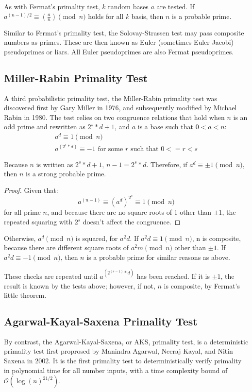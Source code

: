 \documentclass{article}
\begin{document}
As with Fermat's primality test, $k$ random bases $a$ are tested. If $a^{(n - 1) / 2} \equiv (\frac{a}{n}) \pmod{n}$ holds for all $k$ basis, then $n$ is a probable prime.

Similar to Fermat's primality test, the Solovay-Strassen test may pass composite numbers as primes. These are then known as Euler (sometimes Euler-Jacobi) pseudoprimes or liars. All Euler pseudoprimes are also Fermat pseudoprimes. 

\subsection{Miller-Rabin Primality Test} %
A third probabilistic primality test, the Miller-Rabin primality test was discovered first by Gary Miller in 1976, and subsequently modified by Michael Rabin in 1980. The test relies on two congruence relations that hold when $n$ is an odd prime and rewritten as $2^s * d + 1$, and $a$ is a base such that $0 < a < n$:
\begin{gather*}
    a^d \equiv 1 \pmod{n} \\
    a^{(2^r * d)} \equiv -1 \text{ for some $r$ such that $0 <= r < s$}
\end{gather*}

Because $n$ is written as $2^s * d + 1$, $n - 1 = 2^s * d$. Therefore, if $a^d \equiv \pm 1 \pmod{n}$, then $n$ is a strong probable prime.

\begin{proof}
    Given that:
    \[
        a^{(n - 1)} \equiv (a^d)^{2^s} \equiv 1 \pmod{n}
    \]
    for all prime $n$, and because there are no square roots of 1 other than $\pm 1$, the repeated squaring with $2^s$ doesn't affect the congruence.
\end{proof}

Otherwise, $a^d \pmod{n}$ is squared, for $a^2d$. If $a^2d \equiv 1 \pmod{n}$, n is composite, because there are different square roots of $a^2m \pmod{n}$ other than $\pm 1$. If $a^2d \equiv -1 \pmod{n}$, then $n$ is a probable prime for similar reasons as above.

These checks are repeated until $a^{(2^{(s - 1)} * d)}$ has been reached. If it is $\pm 1$, the result is known by the tests above; however, if not, $n$ is composite, by Fermat's little theorem.

\subsection{Agarwal-Kayal-Saxena Primality Test} %
\label{theory:aks}
By contrast, the Agarwal-Kayal-Saxena, or AKS, primality test, is a deterministic primality test first proprosed by Manindra Agarwal, Neeraj Kayal, and Nitin Saxena in 2002. It is the first primality test to deterministically verify primality in polynomial time for all number inputs, with a time complexity bound of $\mathcal{O}(\log{(n)}^{21/2})$.
\end{document}
